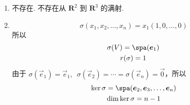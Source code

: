 \begin{enumerate}
    \item 不存在. 不存在从 $ \mathbf{R}^2 $ 到 $ \mathbf{R}^3 $ 的满射.

    \item \[ \sigma(x_1, x_2, \ldots, x_n) = x_1(1, 0, \ldots, 0) \]
          所以
          \begin{gather*}
              \sigma(V) = \spa(\vec{e}_1) \\
              r(\sigma) = 1
          \end{gather*}
          由于 $ \sigma(\vec{e}_1) = \vec{e}_1,\enspace \sigma(\vec{e}_2) = \cdots = \sigma(\vec{e}_n) = \vec{0} $，所以
          \begin{gather*}
              \ker \sigma = \spa(\vec{e}_2, \vec{e}_3, \ldots, \vec{e}_n) \\
              \dim \ker \sigma = n - 1
          \end{gather*}
\end{enumerate}

